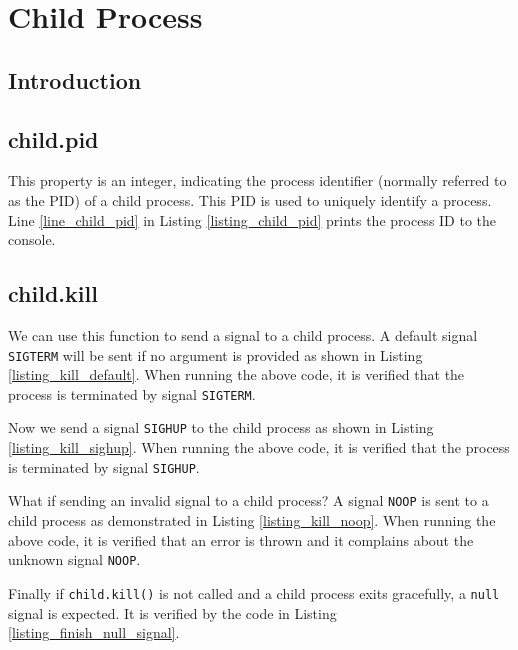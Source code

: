 
\chapter{Child Process}

\section{Introduction}
\section{child.pid}
This property is an integer, indicating the process identifier (normally referred to as the PID) of a child process. This PID is used to uniquely identify a process.
Line \ref{line_child_pid} in Listing \ref{listing_child_pid} prints the process ID to the console.
\section{child.kill}
We can use this function to send a signal to a child process. A default signal \texttt{SIGTERM} will be sent if no argument is provided as shown in Listing \ref{listing_kill_default}.
When running the above code, it is verified that the process is terminated by signal \texttt{SIGTERM}.


Now we send a signal \texttt{SIGHUP} to the child process as shown in Listing \ref{listing_kill_sighup}. When running the above code, it is verified that the process is terminated by signal \texttt{SIGHUP}.


What if sending an invalid signal to a child process? A signal \texttt{NOOP} is sent to a child process as demonstrated in Listing \ref{listing_kill_noop}. When running the above code, it is verified that an error is thrown and it complains about the unknown signal \texttt{NOOP}.

Finally if \texttt{child.kill()} is not called and a child process exits gracefully, a \texttt{null} signal is expected. It is verified by the code in Listing \ref{listing_finish_null_signal}. 
